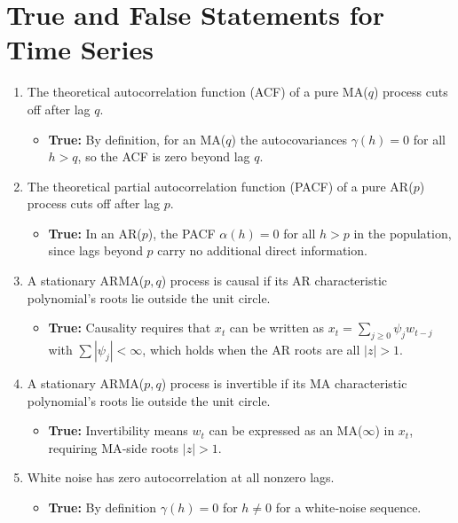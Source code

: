 \documentclass{article}
\begin{document}
\section{True and False Statements for Time Series}
\begin{enumerate}
  \item The theoretical autocorrelation function (ACF) of a pure MA($q$) process cuts off after lag $q$.
  \begin{itemize}
    \item \textbf{True:}  By definition, for an MA($q$) the autocovariances $\gamma(h)=0$ for all $h>q$, so the ACF is zero beyond lag $q$.
  \end{itemize}

  \item The theoretical partial autocorrelation function (PACF) of a pure AR($p$) process cuts off after lag $p$.
  \begin{itemize}
    \item \textbf{True:}  In an AR($p$), the PACF $\alpha(h)=0$ for all $h>p$ in the population, since lags beyond $p$ carry no additional direct information.
  \end{itemize}

  \item A stationary ARMA($p,q$) process is causal if its AR characteristic polynomial’s roots lie outside the unit circle.
  \begin{itemize}
    \item \textbf{True:}  Causality requires that $x_t$ can be written as $x_t=\sum_{j\ge0}\psi_j w_{t-j}$ with $\sum|\psi_j|<\infty$, which holds when the AR roots are all $|z|>1$.
  \end{itemize}

  \item A stationary ARMA($p,q$) process is invertible if its MA characteristic polynomial’s roots lie outside the unit circle.
  \begin{itemize}
    \item \textbf{True:}  Invertibility means $w_t$ can be expressed as an MA($\infty$) in $x_t$, requiring MA‐side roots $|z|>1$.
  \end{itemize}

  \item White noise has zero autocorrelation at all nonzero lags.
  \begin{itemize}
    \item \textbf{True:}  By definition $\gamma(h)=0$ for $h\neq0$ for a white‐noise sequence.
  \end{itemize}


\end{enumerate}
\end{document}
